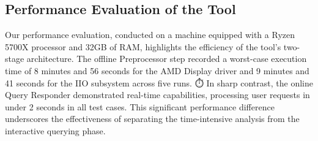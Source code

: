 \subsection{Performance Evaluation of the Tool}

Our performance evaluation, conducted on a machine equipped with a Ryzen 5700X processor 
and 32GB of RAM, highlights the efficiency of the tool's two-stage architecture. 
The offline Preprocessor step recorded a worst-case execution time of 8 minutes and 56 
seconds for the AMD Display driver and 9 minutes and 41 seconds for the IIO subsystem 
across five runs. ⏱️ In sharp contrast, the online Query Responder demonstrated real-time 
capabilities, processing user requests in under 2 seconds in all test cases. This significant 
performance difference underscores the effectiveness of separating the time-intensive 
analysis from the interactive querying phase.
